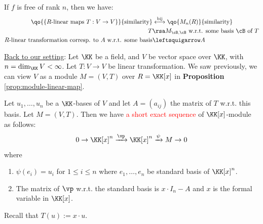 \begin{conclusion}
	If \( f \) is free of rank \( n \), then we have:
	\[
		\begin{aligned}
			\qo{\{ R\text{-linear maps } T: V \to V \}}{\text{similarity}}          & \overset{\text{bij}}{\longleftrightarrow}
			\qo{M_n(R)}{\text{similarity}}                                                                                                           \\
			T                                                                       & \rsa M_{\cB, \cB} \text{ w.r.t. some basis } \cB \text{ of } T \\
			R\text{-linear transformation corresp. to } A \text{ w.r.t. some basis} & \leftsquigarrow A
		\end{aligned}
	\]
\end{conclusion}
\underline{Back to our setting}: Let \( \KK \) be a field, and \( V \) be vector space over \( \KK \), with
\( n = \dim_{\KK} V < \infty \). Let \( T: V \to V \) be linear transformation. We saw previously,
we can view \( V \) as a module \( M = (V,T) \) over \( R = \KK[x] \) in \textbf{Proposition}
\ref{prop:module-linear-map}.

\begin{proposition}
	Let \( u_1, \ldots, u_n \) be a \( \KK \)-bases of \( V \) and let \( A = (a_{ij}) \) the matrix
	of \( T \) w.r.t. this basis. Let \( M = (V,T) \). Then we have \textcolor{red}{a short exact sequence} of \( \KK[x] \)-module as
	follows:
	\[
		0 \to \KK[x]^n \xrightarrow{\vp} \KK[x]^n \xrightarrow{\psi} M \to 0
	\]
	where
	\begin{enumerate}
		\item \( \psi(e_i) = u_i \) for \( 1\leq i \leq n \) where \( e_1,\ldots, e_n \) be standard
		      basis of \( \KK[x]^n \).
		\item The matrix of \( \vp \) w.r.t. the standard basis is \( x\cdot I_n - A \) and \( x \) is
		      the formal variable in \( \KK[x] \).
	\end{enumerate}
	\begin{note}
		Recall that \( T(u) := x\cdot u \).
	\end{note}
\end{proposition}

